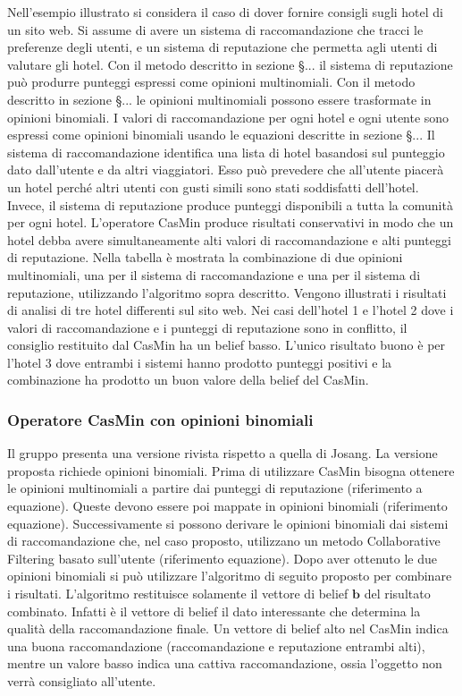 \documentclass{report}
\begin{document}
	Nell'esempio illustrato si considera il caso di dover fornire consigli
	sugli hotel di un sito web. Si assume di avere un sistema di
	raccomandazione che tracci le preferenze degli utenti, e un sistema di
	reputazione che permetta agli utenti di valutare gli hotel. Con il
	metodo descritto in sezione §... il sistema di reputazione può produrre
	punteggi espressi come opinioni multinomiali. Con il metodo descritto in
	sezione §... le opinioni multinomiali possono essere trasformate in
	opinioni binomiali. I valori di raccomandazione per ogni hotel e ogni
	utente sono espressi come opinioni binomiali usando le equazioni
	descritte in sezione §... Il sistema di raccomandazione identifica una
	lista di hotel basandosi sul punteggio dato dall'utente e da altri
	viaggiatori. Esso può prevedere che all'utente piacerà un hotel perché
	altri utenti con gusti simili sono stati soddisfatti dell'hotel. Invece,
	il sistema di reputazione produce punteggi disponibili a tutta la
	comunità per ogni hotel. L'operatore CasMin produce risultati
	conservativi in modo che un hotel debba avere simultaneamente alti
	valori di raccomandazione e alti punteggi di reputazione. Nella tabella
	è mostrata la combinazione di due opinioni multinomiali, una per il
	sistema di raccomandazione e una per il sistema di reputazione,
	utilizzando l'algoritmo sopra descritto. Vengono illustrati i risultati
	di analisi di tre hotel differenti sul sito web. Nei casi dell'hotel 1 e
	l'hotel 2 dove i valori di raccomandazione e i punteggi di reputazione
	sono in conflitto, il consiglio restituito dal CasMin ha un belief
	basso. L'unico risultato buono è per l'hotel 3 dove entrambi i sistemi
	hanno prodotto punteggi positivi e la combinazione ha prodotto un buon
	valore della belief del CasMin.
	
	\hypertarget{header-n192}{%
		\subsubsection{Operatore CasMin con opinioni
			binomiali}\label{header-n192}}
	
	Il gruppo presenta una versione rivista rispetto a quella di Josang. La
	versione proposta richiede opinioni binomiali. Prima di utilizzare
	CasMin bisogna ottenere le opinioni multinomiali a partire dai punteggi
	di reputazione (riferimento a equazione). Queste devono essere poi
	mappate in opinioni binomiali (riferimento equazione). Successivamente
	si possono derivare le opinioni binomiali dai sistemi di raccomandazione
	che, nel caso proposto, utilizzano un metodo Collaborative Filtering
	basato sull'utente (riferimento equazione). Dopo aver ottenuto le due
	opinioni binomiali si può utilizzare l'algoritmo di seguito proposto per
	combinare i risultati. L'algoritmo restituisce solamente il vettore di
	belief $\textbf{b}$ del risultato combinato. Infatti è il vettore di
	belief il dato interessante che determina la qualità della
	raccomandazione finale. Un vettore di belief alto nel CasMin indica una
	buona raccomandazione (raccomandazione e reputazione entrambi alti),
	mentre un valore basso indica una cattiva raccomandazione, ossia
	l'oggetto non verrà consigliato all'utente.
	
\end{document}
